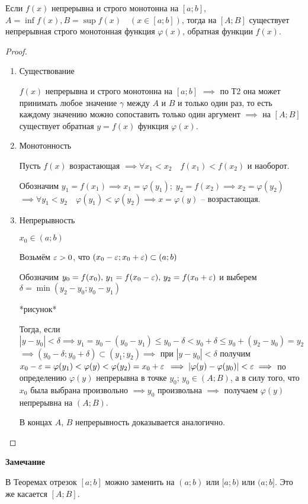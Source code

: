 \begin{theorem}
    Если $f(x)$ непрерывна и строго монотонна на $[a; b]$, 
    $A = \inf f(x), B = \sup f(x) \quad (x \in [a; b])$,
    тогда на $[A; B]$ существует непрерывная строго монотонная функция
    $\varphi(x)$, обратная функции $f(x)$.
\end{theorem}
\begin{proof}
    \begin{enumerate}
        \item 
            Существование
        
            $f(x)$ непрерывна и строго монотонна на $[a; b]$ $\implies$ по Т2 она может
            принимать любое значение $\gamma$ между $A$ и $B$ и только один раз, то есть каждому
            значению можно сопоставить только один аргумент $\implies$ на $[A; B]$ существует
            обратная $y = f(x)$ функция $\varphi(x)$.

        \item
            Монотонность

            Пусть $f(x)$ возрастающая $\implies \forall x_1 < x_2 \quad f(x_1) < f(x_2)$ и наоборот.

            Обозначим $y_1 = f(x_1) \implies x_1 = \varphi(y_1); \; y_2 = f(x_2) \implies x_2 = \varphi(y_2)$
            $\implies \forall y_1 < y_2 \quad \varphi(y_1) < \varphi(y_2) \implies x = \varphi(y)$ -- возрастающая.
        
        \item
            Непрерывность

            $x_0 \in (a; b)$

            Возьмём $\varepsilon > 0$, что $(x_0 - \varepsilon; x_0 + \varepsilon) \subset (a; b)$

            Обозначим $y_0 = f(x_0), \, y_1 = f(x_0 - \varepsilon), \, y_2 = f(x_0 + \varepsilon)$
            и выберем $\delta = \min (y_2 - y_0; y_0 - y_1)$

            *рисунок*

            Тогда, если $|y - y_0| < \delta \implies 
            y_1 = y_0 - (y_0 - y_1) \le y_0 - \delta < y_0 + \delta \le y_0 + (y_2 - y_0) = y_2$
            $\implies (y_0 - \delta; y_0 + \delta) \subset (y_1; y_2) \implies$ при
            $|y - y_0| < \delta$ получим $x_0 - \varepsilon = \varphi(y_1) < \varphi(y) < \varphi(y_2) = x_0 + \varepsilon$
            $\implies |\varphi(y) - \varphi(y_0)| < \varepsilon \implies$ по определению $\varphi(y)$
            непрерывна в точке $y_0$; $y_0 \in (A; B)$, а в силу того, что $x_0$ была выбрана
            произвольно $\implies y_0$ произвольна $\implies$ получаем $\varphi(y)$ непрерывна на $(A; B)$.

            В концах $A$, $B$ непрерывность доказывается аналогично.
        \end{enumerate}
\end{proof}

\textbf{Замечание}

В Теоремах отрезок $[a; b]$ можно заменить на $(a; b)$ или $[a; b)$ или $(a; b]$. Это же касается $[A; B]$.

